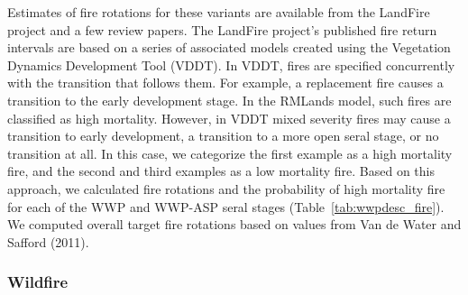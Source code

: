 Estimates of fire rotations for these variants are available from the LandFire project and a few review papers. The LandFire project’s published fire return intervals are based on a series of associated models created using the Vegetation Dynamics Development Tool (VDDT). In VDDT, fires are specified concurrently with the transition that follows them. For example, a replacement fire causes a transition to the early development stage. In the RMLands model, such fires are classified as high mortality. However, in VDDT mixed severity fires may cause a transition to early development, a transition to a more open seral stage, or no transition at all. In this case, we categorize the first example as a high mortality fire, and the second and third examples as a low mortality fire. Based on this approach, we calculated fire rotations and the probability of high mortality fire for each of the WWP and WWP-ASP seral stages (Table~\ref{tab:wwpdesc_fire}). We computed overall target fire rotations based on values from Van de Water and Safford (2011). 

\subsubsection{Wildfire}




